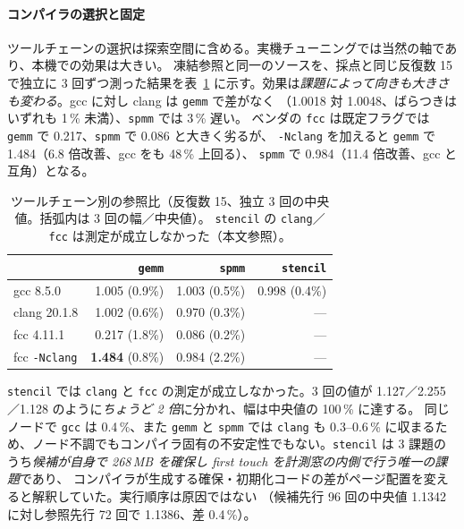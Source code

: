 \documentclass[conference,letterpaper]{IEEEtran}
\begin{document}
\paragraph{コンパイラの選択と固定}
ツールチェーンの選択は探索空間に含める。実機チューニングでは当然の軸であり、本機での効果は大きい。
凍結参照と同一のソースを、採点と同じ反復数 15 で独立に 3 回ずつ測った結果を表~\ref{tab:toolchain}
に示す。効果は\emph{課題によって向きも大きさも変わる}。gcc に対し clang は \texttt{gemm} で差がなく
（1.0018 対 1.0048、ばらつきはいずれも 1\,\% 未満）、\texttt{spmm} では 3\,\% 遅い。
ベンダの \texttt{fcc} は既定フラグでは \texttt{gemm} で 0.217、\texttt{spmm} で 0.086 と大きく劣るが、
\texttt{-Nclang} を加えると \texttt{gemm} で 1.484（6.8 倍改善、gcc をも 48\,\% 上回る）、
\texttt{spmm} で 0.984（11.4 倍改善、gcc と互角）となる。

\begin{table}[t]\centering\footnotesize
\caption{ツールチェーン別の参照比（反復数 15、独立 3 回の中央値。括弧内は 3 回の幅／中央値）。
\texttt{stencil} の \texttt{clang}／\texttt{fcc} は測定が成立しなかった（本文参照）。}
\label{tab:toolchain}
\begin{tabular}{lrrr}
\toprule
 & \texttt{gemm} & \texttt{spmm} & \texttt{stencil} \\
\midrule
gcc 8.5.0            & 1.005 (0.9\%) & 1.003 (0.5\%) & 0.998 (0.4\%) \\
clang 20.1.8         & 1.002 (0.6\%) & 0.970 (0.3\%) & --- \\
fcc 4.11.1           & 0.217 (1.8\%) & 0.086 (0.2\%) & --- \\
fcc \texttt{-Nclang} & \textbf{1.484} (0.8\%) & 0.984 (2.2\%) & --- \\
\bottomrule
\end{tabular}
\end{table}

\texttt{stencil} では \texttt{clang} と \texttt{fcc} の測定が成立しなかった。3 回の値が
1.127／2.255／1.128 のように\emph{ちょうど 2 倍}に分かれ、幅は中央値の 100\,\% に達する。
同じノードで \texttt{gcc} は 0.4\,\%、また \texttt{gemm} と \texttt{spmm} では \texttt{clang} も
0.3--0.6\,\% に収まるため、ノード不調でもコンパイラ固有の不安定性でもない。\texttt{stencil} は
3 課題のうち\emph{候補が自身で 268\,MB を確保し first touch を計測窓の内側で行う唯一の課題}であり、
コンパイラが生成する確保・初期化コードの差がページ配置を変えると解釈していた。実行順序は原因ではない
（候補先行 96 回の中央値 1.1342 に対し参照先行 72 回で 1.1386、差 0.4\,\%）。
\end{document}
